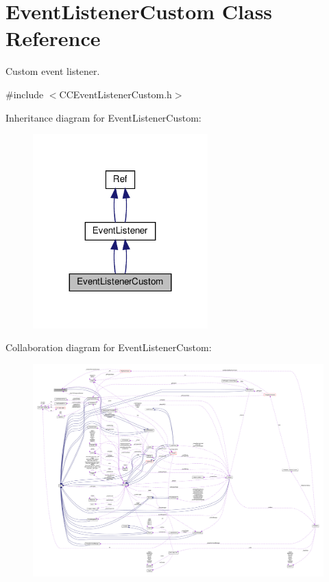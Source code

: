 \hypertarget{classEventListenerCustom}{}\section{Event\+Listener\+Custom Class Reference}
\label{classEventListenerCustom}


Custom event listener.  




{\ttfamily \#include $<$C\+C\+Event\+Listener\+Custom.\+h$>$}



Inheritance diagram for Event\+Listener\+Custom\+:
\nopagebreak
\begin{figure}[H]
\begin{center}
\leavevmode
\includegraphics[width=191pt]{classEventListenerCustom__inherit__graph}
\end{center}
\end{figure}


Collaboration diagram for Event\+Listener\+Custom\+:
\nopagebreak
\begin{figure}[H]
\begin{center}
\leavevmode
\includegraphics[width=350pt]{classEventListenerCustom__coll__graph}
\end{center}
\end{figure}
